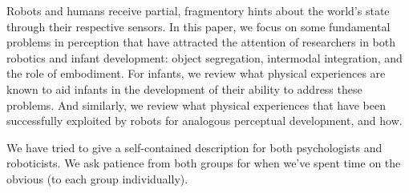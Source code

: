 
Robots and humans receive partial, fragmentory hints about the world's
state through their respective sensors.  In this paper, we focus on
some fundamental problems in perception that have attracted the
attention of researchers in both robotics and infant development:
object segregation, intermodal integration, and the role of embodiment.
For infants, we review what physical experiences are known to aid
infants in the development of their ability to address these problems.
And similarly, we review what physical experiences that have been
successfully exploited by robots for analogous perceptual development,
and how.

We have tried to give a self-contained description 
for both psychologists and roboticists.  We ask patience
from both groups for when we've spent time on the obvious (to each
group individually).

